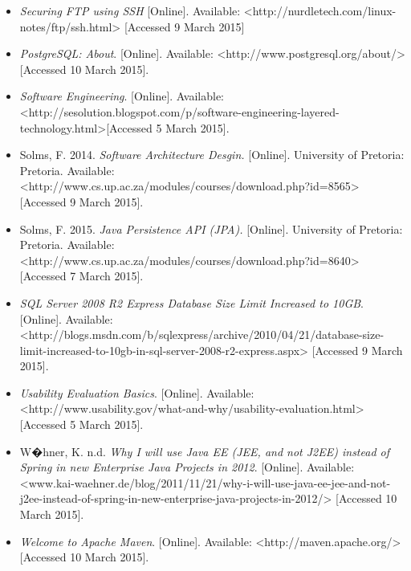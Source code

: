 \documentclass[a4paper,12pt]{report}
\begin{document}
\begin{itemize}
			\item \textit{Securing FTP using SSH} [Online]. Available: <http://nurdletech.com/linux-notes/ftp/ssh.html> [Accessed 9 March 2015]

			\item \textit{PostgreSQL: About}. [Online]. Available: <http://www.postgresql.org/about/> [Accessed 10 March 2015].
			
			\item \textit{Software Engineering}. [Online]. Available: <http://sesolution.blogspot.com/p/software-engineering-layered-technology.html>[Accessed 5 March 2015].
								
			\item Solms, F. 2014. \textit{Software Architecture Desgin.} [Online]. University of Pretoria: Pretoria. Available: <http://www.cs.up.ac.za/modules/courses/download.php?id=8565> [Accessed 9 March 2015].
			
			\item Solms, F. 2015. \textit{Java Persistence API (JPA).} [Online]. University of Pretoria: Pretoria. Available: <http://www.cs.up.ac.za/modules/courses/download.php?id=8640> [Accessed 7 March 2015].
			
			\item \textit{SQL Server 2008 R2 Express Database Size Limit Increased to 10GB}. [Online]. Available: <http://blogs.msdn.com/b/sqlexpress/archive/2010/04/21/database-size-limit-increased-to-10gb-in-sql-server-2008-r2-express.aspx> [Accessed 9 March 2015].
			
			\item \textit{Usability Evaluation Basics}. [Online]. Available: <http://www.usability.gov/what-and-why/usability-evaluation.html> [Accessed 5 March 2015].

			\item W�hner, K. n.d. \textit{Why I will use Java EE (JEE, and not J2EE) instead of Spring in new Enterprise Java Projects in 2012}. [Online]. Available: <www.kai-waehner.de/blog/2011/11/21/why-i-will-use-java-ee-jee-and-not-j2ee-instead-of-spring-in-new-enterprise-java-projects-in-2012/> [Accessed 10 March 2015].		

			\item \textit{Welcome to Apache Maven}. [Online]. Available: <http://maven.apache.org/> [Accessed 10 March 2015].
			

			

			

			

			

			

		\end{itemize}
{} 

\end{document}
